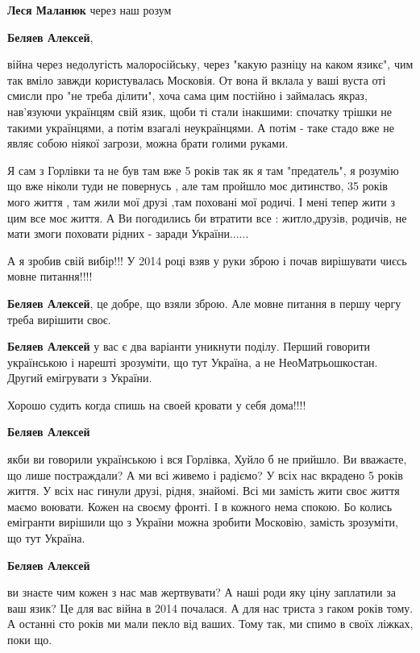 \begin{itemize}
\begin{itemize}
\textbf{Леся Маланюк} через наш розум

\textbf{Беляев Алексей},

війна через недолугість малоросійську, через "какую
разніцу на каком язикє", чим так вміло завжди користувалась Московія. От вона й
вклала у ваші вуста оті смисли про "не треба ділити", хоча сама цим постійно і
займалась якраз, нав'язуючи українцям свій язик, щоби ті стали інакшими:
спочатку трішки не такими українцями, а потім взагалі неукраїнцями. А потім -
таке стадо вже не являє собою ніякої загрози, можна брати голими руками.


Я сам з Горлівки та не був там вже 5 років так як я там "предатель", я розумію
що вже ніколи туди не повернусь , але там пройшло моє дитинство, 35 років мого
життя , там жили мої друзі ,там поховані мої родичі. І мені тепер жити з цим
все моє життя. А Ви погодились би втратити все : житло,друзів, родичів, не мати
змоги поховати рідних - заради України......

А я зробив свій вибір!!! У 2014 році взяв у руки зброю і почав вирішувати чиєсь мовне питання!!!!

\textbf{Беляев Алексей}, це добре, що взяли зброю. Але мовне питання в першу чергу треба вирішити своє.

\textbf{Беляев Алексей} у вас є два варіанти уникнути поділу. Перший говорити українською і нарешті зрозуміти, що тут Україна, а не НеоМатрьошкостан. Другий емігрувати з України.

Хорошо судить когда спишь на своей кровати у себя дома!!!!

\textbf{Беляев Алексей} 

якби ви говорили українською і вся Горлівка, Хуйло б не прийшло. Ви вважаєте,
що лише постраждали? А ми всі живемо і радіємо? У всіх нас вкрадено 5 років
життя. У всіх нас гинули друзі, рідня, знайомі. Всі ми замість жити своє життя
маємо воювати. Кожен на своєму фронті. І в кожного нема спокою. Бо колись
емігранти вирішили що з України можна зробити Московію, замість зрозуміти, що
тут Україна.

\textbf{Беляев Алексей} 

ви знаєте чим кожен з нас мав жертвувати? А наші роди яку ціну заплатили за ваш
язик? Це для вас війна в 2014 почалася. А для нас триста з гаком років тому. А
останні сто років ми мали пекло від ваших. Тому так, ми спимо в своїх ліжках,
поки що.


\end{itemize}
\end{itemize}
